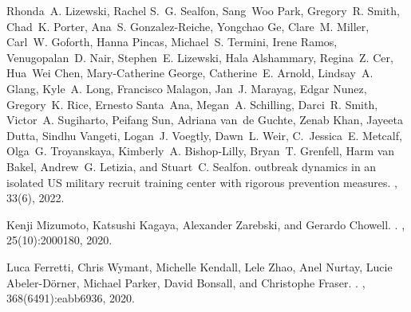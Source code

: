 \documentclass[12pt]{article}
\begin{document}
\begin{thebibliography}{10}
Rhonda~A. Lizewski, Rachel S.~G. Sealfon, Sang~Woo Park, Gregory~R. Smith,
  Chad~K. Porter, Ana~S. Gonzalez-Reiche, Yongchao Ge, Clare~M. Miller, Carl~W.
  Goforth, Hanna Pincas, Michael~S. Termini, Irene Ramos, Venugopalan~D. Nair,
  Stephen~E. Lizewski, Hala Alshammary, Regina~Z. Cer, Hua~Wei Chen,
  Mary-Catherine George, Catherine~E. Arnold, Lindsay~A. Glang, Kyle~A. Long,
  Francisco Malagon, Jan~J. Marayag, Edgar Nunez, Gregory~K. Rice, Ernesto
  Santa~Ana, Megan~A. Schilling, Darci~R. Smith, Victor~A. Sugiharto, Peifang
  Sun, Adriana van~de Guchte, Zenab Khan, Jayeeta Dutta, Sindhu Vangeti,
  Logan~J. Voegtly, Dawn~L. Weir, C.~Jessica~E. Metcalf, Olga~G. Troyanskaya,
  Kimberly~A. Bishop-Lilly, Bryan~T. Grenfell, Harm van Bakel, Andrew~G.
  Letizia, and Stuart~C. Sealfon.
 outbreak dynamics in an isolated {US} military recruit
  training center with rigorous prevention measures.
, 33(6), 2022.

Kenji Mizumoto, Katsushi Kagaya, Alexander Zarebski, and Gerardo Chowell.
.
, 25(10):2000180, 2020.

Luca Ferretti, Chris Wymant, Michelle Kendall, Lele Zhao, Anel Nurtay, Lucie
  Abeler-D{\"o}rner, Michael Parker, David Bonsall, and Christophe Fraser.
.
, 368(6491):eabb6936, 2020.


\end{thebibliography}
\end{document}
